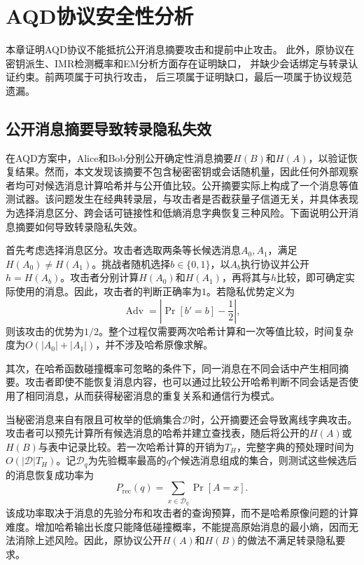 \documentclass[UTF8,10pt,a4paper]{ctexart}
\theoremstyle{aqdplain}
\newcommand{\Adv}{\operatorname{Adv}}
\begin{document}
\section{AQD协议安全性分析}
\label{sec:cryptanalysis}

本章证明AQD协议不能抵抗公开消息摘要攻击和提前中止攻击。
此外，原协议在密钥派生、IMR检测概率和EM分析方面存在证明缺口，
并缺少会话绑定与转录认证约束。前两项属于可执行攻击，
后三项属于证明缺口，最后一项属于协议规范遗漏。

\subsection{公开消息摘要导致转录隐私失效}
\label{sec:hash-leak}
在AQD方案中，Alice和Bob分别公开确定性消息摘要$H(B)$和$H(A)$，以验证恢复结果\citep{zhang2025aqd}。然而，本文发现该摘要不包含秘密密钥或会话随机量，因此任何外部观察者均可对候选消息计算哈希并与公开值比较。公开摘要实际上构成了一个消息等值测试器。该问题发生在经典转录层，与攻击者是否截获量子信道无关，并具体表现为选择消息区分、跨会话可链接性和低熵消息字典恢复三种风险。下面说明公开消息摘要如何导致转录隐私失效。


首先考虑选择消息区分。攻击者选取两条等长候选消息$A_0,A_1$，满足$H(A_0)\neq H(A_1)$。挑战者随机选择$b\in\{0,1\}$，以$A_b$执行协议并公开$h=H(A_b)$。攻击者分别计算$H(A_0)$和$H(A_1)$，再将其与$h$比较，即可确定实际使用的消息。因此，攻击者的判断正确率为$1$。若隐私优势定义为
\[
\Adv=\left|\Pr[b'=b]-\frac{1}{2}\right|,
\]
则该攻击的优势为$1/2$。整个过程仅需要两次哈希计算和一次等值比较，时间复杂度为$O(|A_0|+|A_1|)$，并不涉及哈希原像求解。

其次，在哈希函数碰撞概率可忽略的条件下，同一消息在不同会话中产生相同摘要。攻击者即使不能恢复消息内容，也可以通过比较公开哈希判断不同会话是否使用了相同消息，从而获得秘密消息的重复关系和通信行为模式。

当秘密消息来自有限且可枚举的低熵集合$\mathcal D$时，公开摘要还会导致离线字典攻击。攻击者可以预先计算所有候选消息的哈希并建立查找表，随后将公开的$H(A)$或$H(B)$与表中记录比较。若一次哈希计算的开销为$T_H$，完整字典的预处理时间为$O(|\mathcal D|T_H)$。记$\mathcal D_q$为先验概率最高的$q$个候选消息组成的集合，则测试这些候选后的消息恢复成功率为
\begin{equation}
P_{\mathrm{rec}}(q)
 =\sum_{x\in\mathcal D_q}\Pr[A=x].
\label{eq:dict}
\end{equation}
该成功率取决于消息的先验分布和攻击者的查询预算，而不是哈希原像问题的计算难度。增加哈希输出长度只能降低碰撞概率，不能提高原始消息的最小熵，因而无法消除上述风险。因此，原协议公开$H(A)$和$H(B)$的做法不满足转录隐私要求。
\end{document}
